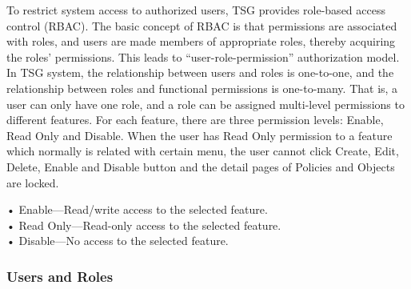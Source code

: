 To restrict system access to authorized users, TSG provides role-based access control (RBAC). The basic concept of RBAC is that permissions are associated with roles, 
and users are made members of appropriate roles, thereby acquiring the roles' permissions. This leads to “user-role-permission” authorization model. In TSG system, 
the relationship between users and roles is one-to-one, and the relationship between roles and functional permissions is one-to-many. That is, a user can only have one role, 
and a role can be assigned multi-level permissions to different features. For each feature, there are three permission levels: Enable, Read Only and Disable. 
When the user has Read Only permission to a feature which normally is related with certain menu, the user cannot click Create, Edit, Delete, Enable and Disable button 
and the detail pages of Policies and Objects are locked. 


• Enable—Read/write access to the selected feature.\\   
• Read Only—Read-only access to the selected feature.\\   
• Disable—No access to the selected feature.\\

\subsubsection*{\hypertarget{link:Users and Roles}{Users and Roles}}
\label{sec:intro:admin:users:role}

